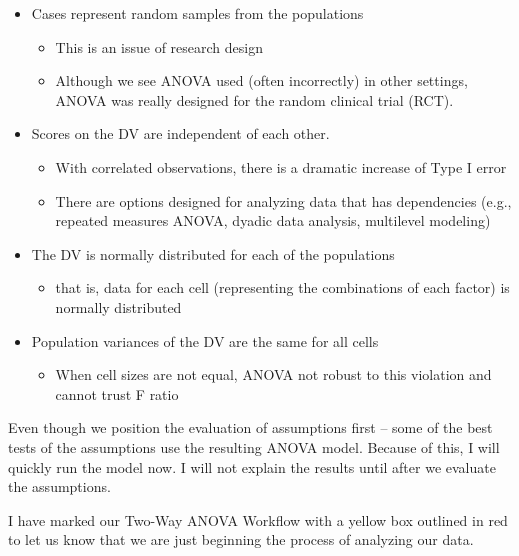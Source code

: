 \documentclass[
  11pt,
]{book}
\providecommand{\tightlist}{%
  \setlength{\itemsep}{0pt}\setlength{\parskip}{0pt}}
\begin{document}
\begin{itemize}
\tightlist
\item
  Cases represent random samples from the populations

  \begin{itemize}
  \tightlist
  \item
    This is an issue of research design
  \item
    Although we see ANOVA used (often incorrectly) in other settings, ANOVA was really designed for the random clinical trial (RCT).
  \end{itemize}
\item
  Scores on the DV are independent of each other.

  \begin{itemize}
  \tightlist
  \item
    With correlated observations, there is a dramatic increase of Type I error
  \item
    There are options designed for analyzing data that has dependencies (e.g., repeated measures ANOVA, dyadic data analysis, multilevel modeling)
  \end{itemize}
\item
  The DV is normally distributed for each of the populations

  \begin{itemize}
  \tightlist
  \item
    that is, data for each cell (representing the combinations of each factor) is normally distributed
  \end{itemize}
\item
  Population variances of the DV are the same for all cells

  \begin{itemize}
  \tightlist
  \item
    When cell sizes are not equal, ANOVA not robust to this violation and cannot trust F ratio
  \end{itemize}
\end{itemize}

Even though we position the evaluation of assumptions first -- some of the best tests of the assumptions use the resulting ANOVA model. Because of this, I will quickly run the model now. I will not explain the results until after we evaluate the assumptions.

I have marked our Two-Way ANOVA Workflow with a yellow box outlined in red to let us know that we are just beginning the process of analyzing our data.
\end{document}
